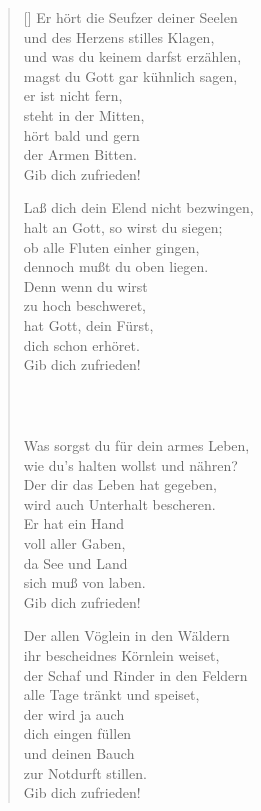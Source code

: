 \begin{multicols}{2}
\begin{verse}[\versewidth]
 Er hört die Seufzer deiner Seelen\\
und des Herzens stilles Klagen,\\
und was du keinem darfst erzählen,\\
magst du Gott gar kühnlich sagen,\\
er ist nicht fern,\\
steht in der Mitten,\\
hört bald und gern\\
der Armen Bitten.\\
Gib dich zufrieden!

 Laß dich dein Elend nicht bezwingen,\\
halt an Gott, so wirst du siegen;\\
ob alle Fluten einher gingen,\\
dennoch mußt du oben liegen.\\
Denn wenn du wirst\\
zu hoch beschweret,\\
hat Gott, dein Fürst,\\
dich schon erhöret.\\
Gib dich zufrieden!

\begin{verbatim}



\end{verbatim}

 Was sorgst du für dein armes Leben,\\
wie du's halten wollst und nähren?\\
Der dir das Leben hat gegeben,\\
wird auch Unterhalt bescheren.\\
Er hat ein Hand\\
voll aller Gaben,\\
da See und Land\\
sich muß von laben.\\
Gib dich zufrieden!

 Der allen Vöglein in den Wäldern\\
ihr bescheidnes Körnlein weiset,\\
der Schaf und Rinder in den Feldern\\
alle Tage tränkt und speiset,\\
der wird ja auch\\
dich eingen füllen\\
und deinen Bauch\\
zur Notdurft stillen.\\
Gib dich zufrieden!


\end{verse}
\end{multicols}
